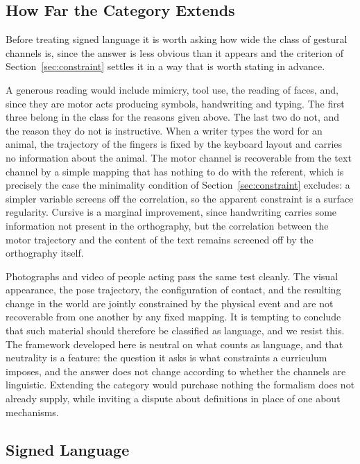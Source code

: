 \documentclass[11pt]{article}
\begin{document}
\subsection{How Far the Category Extends}

Before treating signed language it is worth asking how wide the class of gestural channels is, since the answer is less obvious than it appears and the criterion of Section~\ref{sec:constraint} settles it in a way that is worth stating in advance.

A generous reading would include mimicry, tool use, the reading of faces, and, since they are motor acts producing symbols, handwriting and typing. The first three belong in the class for the reasons given above. The last two do not, and the reason they do not is instructive. When a writer types the word for an animal, the trajectory of the fingers is fixed by the keyboard layout and carries no information about the animal. The motor channel is recoverable from the text channel by a simple mapping that has nothing to do with the referent, which is precisely the case the minimality condition of Section~\ref{sec:constraint} excludes: a simpler variable screens off the correlation, so the apparent constraint is a surface regularity. Cursive is a marginal improvement, since handwriting carries some information not present in the orthography, but the correlation between the motor trajectory and the content of the text remains screened off by the orthography itself.

Photographs and video of people acting pass the same test cleanly. The visual appearance, the pose trajectory, the configuration of contact, and the resulting change in the world are jointly constrained by the physical event and are not recoverable from one another by any fixed mapping. It is tempting to conclude that such material should therefore be classified as language, and we resist this. The framework developed here is neutral on what counts as language, and that neutrality is a feature: the question it asks is what constraints a curriculum imposes, and the answer does not change according to whether the channels are linguistic. Extending the category would purchase nothing the formalism does not already supply, while inviting a dispute about definitions in place of one about mechanisms.

\subsection{Signed Language}
\end{document}
